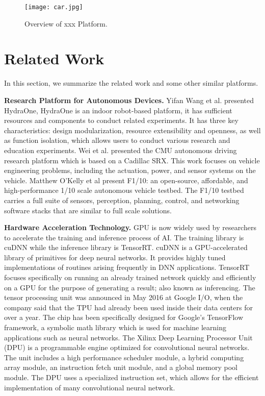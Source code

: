 \documentclass[conference]{IEEEtran}
\begin{document}
\begin{sloppypar}
\begin{figure}[htbp]
\centerline{\texttt{[image: car.jpg]}}
\caption{Overview of xxx Platform.}
\label{ov}
\end{figure}

\section{Related Work}

In this section, we summarize the related work and some other similar platforms.

\textbf{Research Platform for Autonomous Devices.} Yifan Wang et al. presented HydraOne\cite{b9}, HydraOne is an indoor robot-based platform, it has sufficient resources and components to conduct related experiments. It has three key characteristics: design modularization, resource extensibility and openness, as well as function isolation, which allows users to conduct various research and education experiments. Wei et al. presented the CMU autonomous driving research platform which is based on a Cadillac SRX\cite{b10}. This work focuses on vehicle engineering problems, including the actuation, power, and sensor systems on the vehicle. Matthew O’Kelly et al present F1/10\cite{b11}: an open-source, affordable, and high-performance 1/10 scale autonomous vehicle testbed. The F1/10 testbed carries a full suite of sensors, perception, planning, control, and networking software stacks that are similar to full scale solutions. 

\textbf{Hardware Acceleration Technology.} GPU\cite{b12} is now widely used by researchers to accelerate the training and inference process of AI. The training library is cuDNN\cite{b13} while the inference library is TensorRT\cite{b14}. cuDNN is a GPU-accelerated library of primitives for deep neural networks. It provides highly tuned implementations of routines arising frequently in DNN applications. TensorRT focuses specifically on running an already trained network quickly and efficiently on a GPU for the purpose of generating a result; also known as inferencing. The tensor processing unit was announced in May 2016 at Google I/O, when the company said that the TPU had already been used inside their data centers for over a year\cite{b15}. The chip has been specifically designed for Google's TensorFlow framework, a symbolic math library which is used for machine learning applications such as neural networks.\cite{b16} The Xilinx Deep Learning Processor Unit (DPU)\cite{b17} is a programmable engine optimized for convolutional neural networks. The unit includes a high performance scheduler module, a hybrid computing array module, an instruction fetch unit module, and a global memory pool module. The DPU uses a specialized instruction set, which allows for the efficient implementation of many convolutional neural network.


\end{sloppypar}
\end{document}
